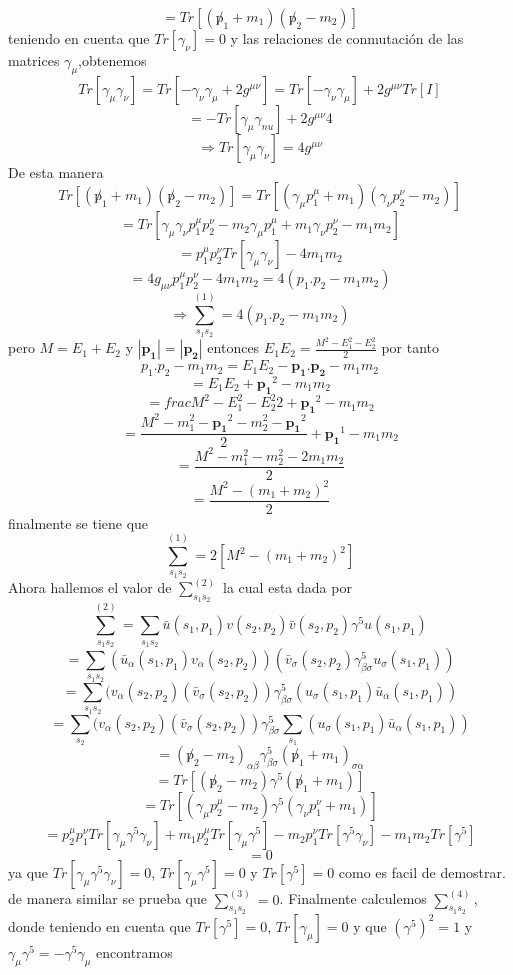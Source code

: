 \[
 =Tr[(\not p_1+m_1)(\not p_2-m_2)]
\]
teniendo en cuenta que $Tr[\gamma_{\nu}]=0$ y las relaciones de conmutación de las matrices $\gamma_{\mu}$,obtenemos
\[
 Tr[\gamma_{\mu}\gamma_{\nu}]=Tr[-\gamma_{\nu}\gamma_{\mu}+2g^{\mu\nu}]=Tr[-\gamma_{\nu}\gamma_{\mu}]+2g^{\mu\nu}Tr[I]
\]
\[
 =-Tr[\gamma_{\mu}\gamma_{nu}]+2g^{\mu\nu}4
\]
\[
 \Rightarrow Tr[\gamma_{\mu}\gamma_{\nu}]=4g^{\mu\nu}
\]
De esta manera
\[
 Tr[(\not p_1+m_1)(\not p_2-m_2)]=Tr[(\gamma_{\mu}p^{\mu}_1+m_1)(\gamma_{\nu}p^{\nu}_2-m_2)]
\]
\[
 =Tr[\gamma_{\mu}\gamma_{\nu}p^{\mu}_1p^{\nu}_2-m_2\gamma_{\mu}p^{\mu}_1+m_1\gamma_{\nu}p^{\nu}_2-m_1m_2]
\]
\[
 =p^{\mu}_1p^{\nu}_2Tr[\gamma_{\mu}\gamma_{\nu}]-4m_1m_2
\]
\[
 =4g_{\mu\nu}p^{\mu}_1p^{\nu}_2-4m_1m_2=4(p_1.p_2-m_1m_2)
\]
\[
 \Rightarrow  \sum_{s_1s_2}^{(1)}=4(p_1.p_2-m_1m_2)
\]
pero $M=E_1+E_2$ y $|\mathbf{p_1}|=|\mathbf{p_2}|$ entonces $E_1E_2=\frac{M^{2}-E^{2}_1-E^{2}_2}{2}$ por tanto
\[
 p_1.p_2-m_1m_2=E_1E_2-\mathbf{p_1}.\mathbf{p_2}-m_1m_2
\]
\[
 =E_1E_2+\mathbf{p_1}^{2}-m_1m_2
\]
\[
 =frac{M^{2}-E^{2}_1-E^{2}_2}{2}+\mathbf{p_1}^{2}-m_1m_2
\]
\[
 =\frac{M^{2}-m^{2}_1-\mathbf{p_1}^{2}-m^{2}_2-\mathbf{p_1}^{2}}{2}+\mathbf{p_1}^{1}-m_1m_2
\]
\[
 =\frac{M^{2}-m^{2}_1-m^{2}_2-2m_1m_2}{2}
\]
\[
 =\frac{M^{2}-(m_1+m_2)^{2}}{2}
\]
finalmente se tiene que
\[
 \sum_{s_1s_2}^{(1)}=2[M^{2}-(m_1+m_2)^{2}]
\]
Ahora hallemos el valor de $\sum_{s_1s_2}^{(2)}$ la cual esta dada por
\[
 \sum_{s_1s_2}^{(2)}=\sum_{s_1s_2}\bar{u}(s_1,p_1)v(s_2,p_2)\bar{v}(s_2,p_2) \gamma^{5}u(s_1,p_1)
\]
\[
 =\sum_{s_1s_2}(\bar{u}_{\alpha}(s_1,p_1)v_{\alpha}(s_2,p_2))(\bar{v}_{\sigma}(s_2,p_2) \gamma^{5}_{\beta\sigma}u_{\sigma}(s_1,p_1))
\]
\[
 =\sum_{s_1s_2}(v_{\alpha}(s_2,p_2)(\bar{v}_{\sigma}(s_2,p_2)) \gamma^{5}_{\beta\sigma}(u_{\sigma}(s_1,p_1)\bar{u}_{\alpha}(s_1,p_1))
\]
\[
 =\sum_{s_2}(v_{\alpha}(s_2,p_2)(\bar{v}_{\sigma}(s_2,p_2)) \gamma^{5}_{\beta\sigma}\sum_{s_1}(u_{\sigma}(s_1,p_1)\bar{u}_{\alpha}(s_1,p_1))
\]
\[
 =(\not p_2-m_2)_{\alpha\beta}\gamma^{5}_{\beta\sigma}(\not p_1+m_1)_{\sigma\alpha}
\]
\[
 =Tr[(\not p_2-m_2)\gamma^{5}(\not p_1+m_1)]
\]
\[
 =Tr[(\gamma_{\mu}p^{\mu}_2-m_2)\gamma^{5}(\gamma_{\nu}p^{\nu}_1+m_1)]
\]
\[
 =p^{\mu}_2p^{\nu}_1Tr[\gamma_{\mu}\gamma^{5}\gamma_{\nu}]+m_1p^{\mu}_2Tr[\gamma_{\mu}\gamma^{5}]-m_2p^{\nu}_1Tr[\gamma^{5}\gamma_{\nu}]-m_1m_2Tr[\gamma^{5}]
\]
\[
 =0
\]
ya que $Tr[\gamma_{\mu}\gamma^{5}\gamma_{\nu}]=0$, $Tr[\gamma_{\mu}\gamma^{5}]=0$ y $Tr[\gamma^{5}]=0$ como es facil de demostrar.
de manera similar se prueba que $\sum_{s_1s_2}^{(3)}=0$. Finalmente calculemos $\sum_{s_1s_2}^{(4)}$, donde teniendo en cuenta que $Tr[\gamma^{5}]=0$, $Tr[\gamma_{\mu}]=0$ y que $(\gamma^{5})^{2}=1$ y $\gamma_{\mu}\gamma^{5}=-\gamma^{5}\gamma_{\mu}$ encontramos
